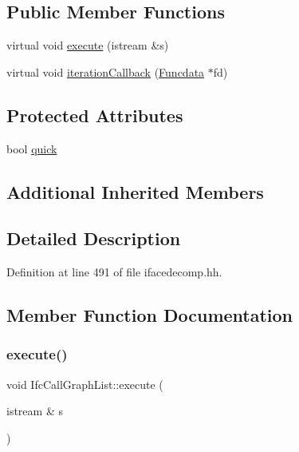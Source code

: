 \subsection*{Public Member Functions}
\begin{DoxyCompactItemize}
\item 
virtual void \mbox{\hyperlink{class_ifc_call_graph_list_ac481079688c06e5250db1b8ea81e8cc7}{execute}} (istream \&s)
\item 
virtual void \mbox{\hyperlink{class_ifc_call_graph_list_aa7250e67ebde654dd6792caf88186f6c}{iteration\+Callback}} (\mbox{\hyperlink{class_funcdata}{Funcdata}} $\ast$fd)
\end{DoxyCompactItemize}
\subsection*{Protected Attributes}
\begin{DoxyCompactItemize}
\item 
bool \mbox{\hyperlink{class_ifc_call_graph_list_a1ed0d0deb8a5e563f82d204b36aae05f}{quick}}
\end{DoxyCompactItemize}
\subsection*{Additional Inherited Members}


\subsection{Detailed Description}


Definition at line 491 of file ifacedecomp.\+hh.



\subsection{Member Function Documentation}
\mbox{\label{class_ifc_call_graph_list_ac481079688c06e5250db1b8ea81e8cc7}} 
\subsubsection{\texorpdfstring{execute()}{execute()}}
{\footnotesize\ttfamily void Ifc\+Call\+Graph\+List\+::execute (\begin{DoxyParamCaption}\item[{istream \&}]{s }\end{DoxyParamCaption})\hspace{0.3cm}{\ttfamily [virtual]}}



